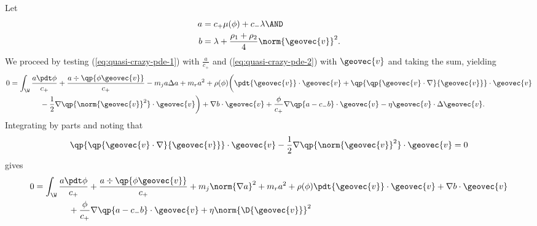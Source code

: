 \documentclass[final]{amsart}
\numberwithin{equation}{section}
\begin{document}
\begin{Proof}
  Let
  \begin{equation}
    \begin{split}
      a 
      &=
      c_+ 
      \mu(\phi)
      +
      c_- \lambda
      \AND
      \\
      b
      &= 
      \lambda 
      +
      \frac{\rho_1 + \rho_2}
      {4}
      \norm{{\geovec{v}}}^2.
    \end{split}
  \end{equation}
  We proceed by testing (\ref{eq:quasi-crazy-pde-1}) with
  $\frac{a}{c_+}$ and (\ref{eq:quasi-crazy-pde-2}) with ${\geovec{v}}$ and
  taking the sum, yielding
  \begin{equation}
    \begin{split}
      0 
      &=
      \int_\W
      \frac{a\pdt \phi}
           {c_+}
      +
      \frac{a\div\qp{\phi{\geovec{v}}}}
           {c_+}
      -
      m_j a \Delta a 
      +
      m_r a^2
      +
      \rho(\phi)
      \bigg(
        \pdt{{\geovec{v}}} \cdot {\geovec{v}}
        +
        \qp{\qp{{\geovec{v}} \cdot \nabla}{\geovec{v}} }
        \cdot {\geovec{v}}
        \\
        &
        \qquad\qquad 
        -
        \frac{1}{2}
        \nabla\qp{\norm{{\geovec{v}}}^2}\cdot {\geovec{v}}
        \bigg)
      +
      \nabla b \cdot {\geovec{v}}
      +
      \frac{\phi}{c_+}
      \nabla
      \qp{a - c_- b} \cdot {\geovec{v}}
      -
      \eta {\geovec{v}} \cdot \Delta {\geovec{v}}.
   \end{split}
  \end{equation}
  Integrating by parts and noting that
  \begin{equation}
    \qp{\qp{{\geovec{v}} \cdot \nabla}{\geovec{v}} }
    \cdot {\geovec{v}}
    -
    \frac{1}{2}
    \nabla\qp{\norm{{\geovec{v}}}^2} \cdot {\geovec{v}}
    =
    0 
  \end{equation}
  gives
  \begin{equation}
    \begin{split}
      0
      &=
      \int_\W
      \frac{a\pdt \phi }
           {c_+}
      +
      \frac{a\div\qp{\phi{\geovec{v}}}}
           {c_+}
      +
      m_j \norm{\nabla a}^2
      +
      m_r a^2
      +
      \rho(\phi)
      \pdt{{\geovec{v}}} \cdot {\geovec{v}}
      +
      \nabla b \cdot {\geovec{v}} 
      \\
      &\qquad\qquad +
      \frac{\phi}{c_+}
      \nabla \qp{a - c_- b} \cdot {\geovec{v}}
      +
      \eta \norm{\D {\geovec{v}}}^2     

\end{split}
\end{equation}
\end{Proof}
\end{document}
